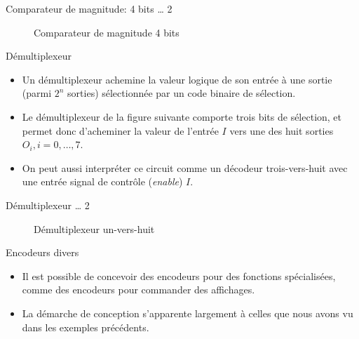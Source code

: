 \documentclass[presentation]{beamer}
\begin{document}
\begin{frame}[label={sec:org7ec38b2}]{Comparateur de magnitude: 4 bits \ldots{} 2}
\begin{figure}[htbp]
\centering

\caption{\label{fig:org5368d48}Comparateur de magnitude 4 bits}
\end{figure}
\end{frame}

\begin{frame}[label={sec:orga1fbcd3}]{Démultiplexeur}
\begin{itemize}
\item Un démultiplexeur achemine la valeur logique de son entrée à une sortie (parmi \(2^n\) sorties) sélectionnée par un code binaire de sélection.

\item Le démultiplexeur de la figure suivante comporte trois bits de sélection, et permet donc d'acheminer la valeur de l'entrée \(I\) vers une des huit sorties \(O_i, i = 0, \ldots, 7\).

\item On peut aussi interpréter ce circuit comme un décodeur trois-vers-huit avec une entrée signal de contrôle (\emph{enable}) \(I\).
\end{itemize}
\end{frame}

\begin{frame}[label={sec:org7b4f2bf}]{Démultiplexeur \ldots{} 2}
\begin{figure}[htbp]
\centering

\caption{\label{fig:org0a5415c}Démultiplexeur un-vers-huit}
\end{figure}
\end{frame}

\begin{frame}[label={sec:org67c2099}]{Encodeurs divers}
\begin{itemize}
\item Il est possible de concevoir des encodeurs pour des fonctions spécialisées, comme des encodeurs pour commander des affichages.

\item La démarche de conception s'apparente largement à celles que nous avons vu dans les exemples précédents.
\end{itemize}
\end{frame}
\end{document}
